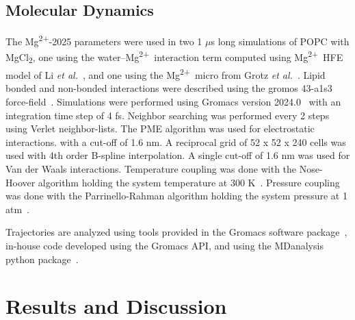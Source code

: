\documentclass[12pt,openany,final]{book}
\newcommand{\etal}{\textit{et al.}}
\newcommand{\mg}{Mg\textsuperscript{2+}}
\newcommand{\mgcl}{MgCl\textsubscript{2}}
\begin{document}
\subsection{Molecular Dynamics}
The \mg-2025 parameters were used in
two 1 $\mu$s long simulations of POPC with \mgcl{}, one using the water--\mg~interaction term computed using \mg~HFE model of Li \etal~\cite{merzhfe}, and
one using the \mg~micro from Grotz \etal~\cite{grotz:2021:optimized,micro}.
Lipid bonded and non-bonded interactions were described using the gromos 43-a1s3 force-field~\cite{chiu:2009}.
Simulations were performed using Gromacs version
2024.0~\cite{gromacs}
with an integration time step of 4 fs.
Neighbor searching was performed every 2 steps using Verlet neighbor-lists.
The PME algorithm was used for electrostatic interactions.
with a cut-off of 1.6 nm.
A reciprocal grid of 52 x 52 x 240 cells was used with 4th order B-spline interpolation.
A single cut-off of 1.6 nm was used for Van der Waals interactions.
Temperature coupling was done with the Nose-Hoover algorithm holding the system temperature at 300 K~\cite{nose:1983}.
Pressure coupling was done with the Parrinello-Rahman algorithm holding the system pressure at 1 atm~\cite{parrinello:1981}.

Trajectories are analyzed using tools provided in the Gromacs software package~\cite{gromacs}, in-house code developed using the Gromacs API, and using the MDanalysis python package~\cite{mdanalysis1,mdanalysis2}.

\section{Results and Discussion}
\end{document}
